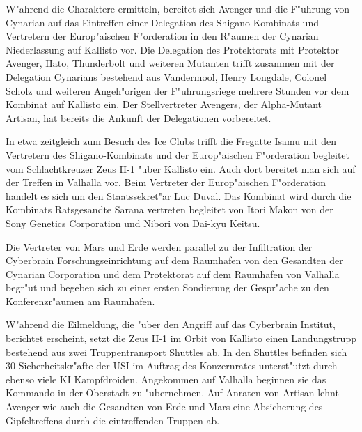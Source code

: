 
W"ahrend die Charaktere ermitteln, bereitet sich Avenger und die F"uhrung von Cynarian auf das Eintreffen einer Delegation des 
Shigano-Kombinats und Vertretern der Europ"aischen F"orderation in den R"aumen der Cynarian Niederlassung auf Kallisto vor. Die Delegation des Protektorats mit Protektor Avenger, Hato, Thunderbolt und weiteren Mutanten trifft zusammen mit der Delegation Cynarians bestehend aus Vandermool, Henry Longdale, Colonel Scholz und weiteren Angeh"origen der F"uhrungsriege mehrere Stunden vor dem Kombinat auf Kallisto ein. Der Stellvertreter Avengers, der Alpha-Mutant Artisan, hat bereits die Ankunft der Delegationen vorbereitet.

In etwa zeitgleich zum Besuch des Ice Clubs trifft die Fregatte Isamu mit den Vertretern des Shigano-Kombinats und der Europ"aischen F"orderation begleitet vom Schlachtkreuzer Zeus II-1 "uber Kallisto ein. Auch dort bereitet man sich auf der Treffen in Valhalla vor.
Beim Vertreter der Europ"aischen F"orderation handelt es sich um den Staatssekret"ar Luc Duval. Das Kombinat wird durch die Kombinats Ratsgesandte Sarana vertreten begleitet von Itori Makon von der Sony Genetics Corporation und Nibori von Dai-kyu Keitsu.

Die Vertreter von Mars und Erde werden parallel zu der Infiltration der Cyberbrain Forschungseinrichtung auf dem Raumhafen von den Gesandten der Cynarian Corporation und dem Protektorat auf dem Raumhafen von Valhalla begr"u\3t und begeben sich zu einer ersten Sondierung der Gespr"ache zu den Konferenzr"aumen am Raumhafen.


W"ahrend die Eilmeldung, die "uber den Angriff auf das Cyberbrain Institut, berichtet erscheint, setzt die Zeus II-1 im Orbit von Kallisto einen Landungstrupp bestehend aus zwei Truppentransport Shuttles ab. In den Shuttles befinden sich 30 Sicherheitskr"afte der USI im Auftrag des Konzernrates unterst"utzt durch ebenso viele KI Kampfdroiden. Angekommen auf Valhalla beginnen sie das Kommando in der Oberstadt zu "ubernehmen. Auf Anraten von Artisan lehnt Avenger wie auch die Gesandten von Erde und Mars eine Absicherung des Gipfeltreffens durch die eintreffenden Truppen ab.


